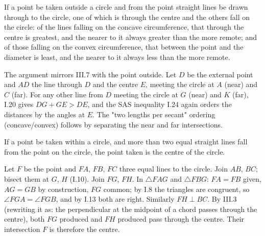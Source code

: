 \begin{claim}
\label{prop:III.8}
If a point be taken outside a circle and from the point straight
lines be drawn through to the circle, one of which is through the
centre and the others fall on the circle: of the lines falling on
the concave circumference, that through the centre is greatest, and
the nearer to it always greater than the more remote; and of those
falling on the convex circumference, that between the point and the
diameter is least, and the nearer to it always less than the more
remote.
\end{claim}
\begin{evidence}
\label{ev:III.8}
The argument mirrors III.7 with the point outside.  Let $D$ be the
external point and $AD$ the line through $D$ and the centre $E$,
meeting the circle at $A$ (near) and $C$ (far).  For any other line
from $D$ meeting the circle at $G$ (near) and $K$ (far), I.20 gives
$DG + GE > DE$, and the SAS inequality I.24 again orders the
distances by the angles at $E$.  The "two lengths per secant"
ordering (concave/convex) follows by separating the near and far
intersections.
\end{evidence}

\begin{claim}
\label{prop:III.9}
If a point be taken within a circle, and more than two equal
straight lines fall from the point on the circle, the point taken is
the centre of the circle.
\end{claim}
\begin{evidence}
\label{ev:III.9}
Let $F$ be the point and $FA$, $FB$, $FC$ three equal lines to the
circle.  Join $AB$, $BC$; bisect them at $G$, $H$ (I.10).  Join
$FG$, $FH$.  In $\triangle FAG$ and $\triangle FBG$: $FA = FB$ given,
$AG = GB$ by construction, $FG$ common; by I.8 the triangles are
congruent, so $\angle FGA = \angle FGB$, and by I.13 both are right.
Similarly $FH \perp BC$.  By III.3 (rewriting it as: the
perpendicular at the midpoint of a chord passes through the centre),
both $FG$ produced and $FH$ produced pass through the centre.  Their
intersection $F$ is therefore the centre.
\end{evidence}

